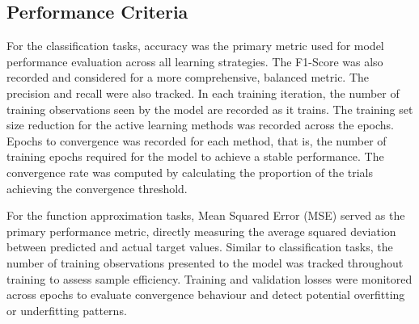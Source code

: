 \documentclass[10pt, conference]{IEEEtran}
\begin{document}
\subsection{Performance Criteria}
For the classification tasks, accuracy was the primary metric used for model performance evaluation across all learning strategies. The F1-Score was also recorded and considered for a more comprehensive, balanced metric. The precision and recall were also tracked. In each training iteration, the number of training observations seen by the model are recorded as it trains. The training set size reduction for the active learning methods was recorded across the epochs. Epochs to convergence was recorded for each method, that is, the number of training epochs required for the model to achieve a stable performance. The convergence rate was computed by calculating the proportion of the trials achieving the convergence threshold.

For the function approximation tasks, Mean Squared Error (MSE) served as the primary performance metric, directly measuring the average squared deviation between predicted and actual target values. Similar to classification tasks, the number of training observations presented to the model was tracked throughout training to assess sample efficiency. Training and validation losses were monitored across epochs to evaluate convergence behaviour and detect potential overfitting or underfitting patterns.
\end{document}
